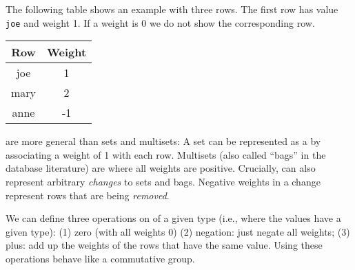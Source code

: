 The following table shows an example \zr with three rows.  The first
row has value \texttt{joe} and weight 1.  If a weight is 0 we do not
show the corresponding row.

\begin{center}
\begin{tabular}{|c|c|}\hline
  Row & Weight \\ \hline
  joe & 1 \\
  mary & 2 \\
  anne & -1 \\ \hline
\end{tabular}
\end{center}


\zrs are more general than sets and multisets: A set can be
represented as a \zr by associating a weight of 1 with each row.
Multisets (also called ``bags'' in the database literature) are \zrs
where all weights are positive.  Crucially, \zrs can also represent
arbitrary \emph{changes} to sets and bags.  Negative weights in a
change represent rows that are being \emph{removed}.

We can define three operations on \zr of a given type (i.e., where
the values have a given type): (1) zero (with all weights 0) (2)
negation: just negate all weights; (3) plus: add up the weights of the
rows that have the same value.  Using these operations \zrs behave
like a commutative group.


